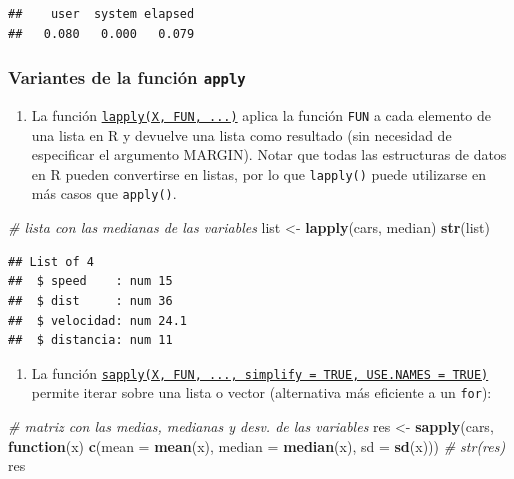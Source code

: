 \documentclass[
]{book}
\newenvironment{Shaded}{\begin{snugshade}}{\end{snugshade}}
\newcommand{\AttributeTok}[1]{\textcolor[rgb]{0.13,0.29,0.53}{#1}}
\newcommand{\CommentTok}[1]{\textcolor[rgb]{0.56,0.35,0.01}{\textit{#1}}}
\newcommand{\ControlFlowTok}[1]{\textcolor[rgb]{0.13,0.29,0.53}{\textbf{#1}}}
\newcommand{\FunctionTok}[1]{\textcolor[rgb]{0.13,0.29,0.53}{\textbf{#1}}}
\newcommand{\NormalTok}[1]{#1}
\newcommand{\OtherTok}[1]{\textcolor[rgb]{0.56,0.35,0.01}{#1}}
\providecommand{\tightlist}{%
  \setlength{\itemsep}{0pt}\setlength{\parskip}{0pt}}
\begin{document}
\begin{verbatim}
##    user  system elapsed 
##   0.080   0.000   0.079
\end{verbatim}

\subsubsection{\texorpdfstring{Variantes de la función \texttt{apply}}{Variantes de la función apply}}\label{variantes-de-la-funciuxf3n-apply}

\begin{enumerate}
\def\labelenumi{\alph{enumi}.}
\tightlist
\item
  La función \href{https://www.rdocumentation.org/packages/base/versions/3.6.1/topics/lapply}{\texttt{lapply(X,\ FUN,\ ...)}}
  aplica la función \texttt{FUN} a cada elemento de una lista en R y devuelve una lista como resultado (sin necesidad de especificar el argumento MARGIN). Notar que todas las estructuras de datos en R pueden convertirse en listas, por lo que \texttt{lapply()} puede utilizarse en más casos que \texttt{apply()}.
\end{enumerate}

\begin{Shaded}
\begin{Highlighting}[]
\CommentTok{\# lista con las medianas de las variables}
\NormalTok{list }\OtherTok{\textless{}{-}} \FunctionTok{lapply}\NormalTok{(cars, median)}
\FunctionTok{str}\NormalTok{(list)}
\end{Highlighting}
\end{Shaded}

\begin{verbatim}
## List of 4
##  $ speed    : num 15
##  $ dist     : num 36
##  $ velocidad: num 24.1
##  $ distancia: num 11
\end{verbatim}

\begin{enumerate}
\def\labelenumi{\alph{enumi}.}
\setcounter{enumi}{1}
\tightlist
\item
  La función
  \href{https://www.rdocumentation.org/packages/base/versions/3.6.1/topics/sapply}{\texttt{sapply(X,\ FUN,\ ...,\ simplify\ =\ TRUE,\ USE.NAMES\ =\ TRUE)}} permite iterar sobre una lista o vector (alternativa más eficiente a un \texttt{for}):
\end{enumerate}

\begin{Shaded}
\begin{Highlighting}[]
\CommentTok{\# matriz con las medias, medianas y desv. de las variables}
\NormalTok{res }\OtherTok{\textless{}{-}} \FunctionTok{sapply}\NormalTok{(cars, }
          \ControlFlowTok{function}\NormalTok{(x) }\FunctionTok{c}\NormalTok{(}\AttributeTok{mean =} \FunctionTok{mean}\NormalTok{(x), }
                        \AttributeTok{median =} \FunctionTok{median}\NormalTok{(x), }
                        \AttributeTok{sd =} \FunctionTok{sd}\NormalTok{(x)))}
\CommentTok{\# str(res)}
\NormalTok{res}
\end{Highlighting}
\end{Shaded}
\end{document}
